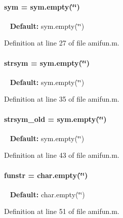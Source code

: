 \paragraph[{sym}]{\setlength{\rightskip}{0pt plus 5cm}sym = sym.\+empty(\char`\"{}\char`\"{})}\label{classamifun_a3c48fff3d28406486a4f1b5e18da7ca6}
~\newline
{\bfseries Default\+:} sym.\+empty(\char`\"{}\char`\"{}) 

Definition at line 27 of file amifun.\+m.

\hypertarget{classamifun_a4814315a739f43461b003c1c1ef6f550}{}
\paragraph[{strsym}]{\setlength{\rightskip}{0pt plus 5cm}strsym = sym.\+empty(\char`\"{}\char`\"{})}\label{classamifun_a4814315a739f43461b003c1c1ef6f550}
~\newline
{\bfseries Default\+:} sym.\+empty(\char`\"{}\char`\"{}) 

Definition at line 35 of file amifun.\+m.

\hypertarget{classamifun_ac42759baa6575c9d39f487be5a2e01a1}{}
\paragraph[{strsym\+\_\+old}]{\setlength{\rightskip}{0pt plus 5cm}strsym\+\_\+old = sym.\+empty(\char`\"{}\char`\"{})}\label{classamifun_ac42759baa6575c9d39f487be5a2e01a1}
~\newline
{\bfseries Default\+:} sym.\+empty(\char`\"{}\char`\"{}) 

Definition at line 43 of file amifun.\+m.

\hypertarget{classamifun_a484b54379bc8b29b6ce65d84966ea4c4}{}
\paragraph[{funstr}]{\setlength{\rightskip}{0pt plus 5cm}funstr = char.\+empty(\char`\"{}\char`\"{})}\label{classamifun_a484b54379bc8b29b6ce65d84966ea4c4}
~\newline
{\bfseries Default\+:} char.\+empty(\char`\"{}\char`\"{}) 

Definition at line 51 of file amifun.\+m.

